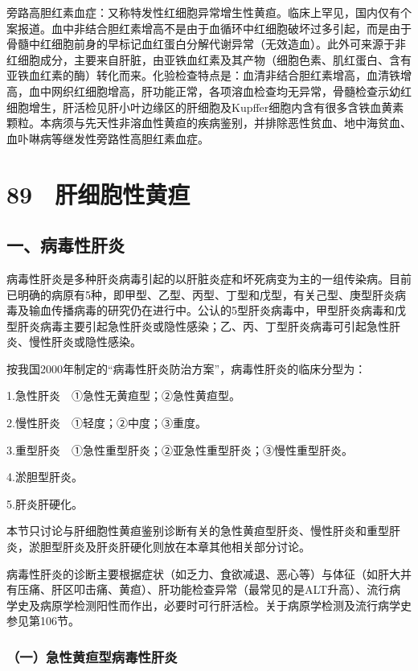 旁路高胆红素血症：又称特发性红细胞异常增生性黄疸。临床上罕见，国内仅有个案报道。血中非结合胆红素增高不是由于血循环中红细胞破坏过多引起，而是由于骨髓中红细胞前身的早标记血红蛋白分解代谢异常（无效造血）。此外可来源于非红细胞成分，主要来自肝脏，由亚铁血红素及其产物（细胞色素、肌红蛋白、含有亚铁血红素的酶）转化而来。化验检查特点是：血清非结合胆红素增高，血清铁增高，血中网织红细胞增高，肝功能正常，各项溶血检查均无异常，骨髓检查示幼红细胞增生，肝活检见肝小叶边缘区的肝细胞及Kupffer细胞内含有很多含铁血黄素颗粒。本病须与先天性非溶血性黄疸的疾病鉴别，并排除恶性贫血、地中海贫血、血卟啉病等继发性旁路性高胆红素血症。

\protect\hypertarget{text00214.html}{}{}

\section{89　肝细胞性黄疸}

\subsection{一、病毒性肝炎}

病毒性肝炎是多种肝炎病毒引起的以肝脏炎症和坏死病变为主的一组传染病。目前已明确的病原有5种，即甲型、乙型、丙型、丁型和戊型，有关己型、庚型肝炎病毒及输血传播病毒的研究仍在进行中。公认的5型肝炎病毒中，甲型肝炎病毒和戊型肝炎病毒主要引起急性肝炎或隐性感染；乙、丙、丁型肝炎病毒可引起急性肝炎、慢性肝炎或隐性感染。

按我国2000年制定的“病毒性肝炎防治方案”，病毒性肝炎的临床分型为：

1.急性肝炎　①急性无黄疸型；②急性黄疸型。

2.慢性肝炎　①轻度；②中度；③重度。

3.重型肝炎　①急性重型肝炎；②亚急性重型肝炎；③慢性重型肝炎。

4.淤胆型肝炎。

5.肝炎肝硬化。

本节只讨论与肝细胞性黄疸鉴别诊断有关的急性黄疸型肝炎、慢性肝炎和重型肝炎，淤胆型肝炎及肝炎肝硬化则放在本章其他相关部分讨论。

病毒性肝炎的诊断主要根据症状（如乏力、食欲减退、恶心等）与体征（如肝大并有压痛、肝区叩击痛、黄疸）、肝功能检查异常（最常见的是ALT升高）、流行病学史及病原学检测阳性而作出，必要时可行肝活检。关于病原学检测及流行病学史参见第106节。

\subsubsection{（一）急性黄疸型病毒性肝炎}

